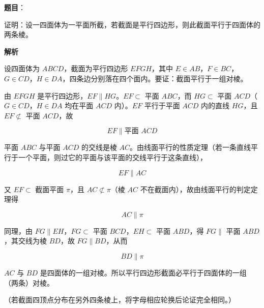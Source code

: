\begin{answer}

\textbf{题目}：

证明：设一四面体为一平面所截，若截面是平行四边形，则此截面平行于四面体的两条棱。

\textbf{解析}

设四面体为 $ABCD$，截面为平行四边形 $EFGH$，其中 $E\in AB$，$F\in BC$，$G\in CD$，$H\in DA$，四条边分别落在四个面内。要证：截面平行于一组对棱。

由 $EFGH$ 是平行四边形，$EF\parallel HG$。$EF\subset$ 平面 $ABC$，而 $HG\subset$ 平面 $ACD$（$G\in CD$，$H\in DA$ 均在平面 $ACD$ 内）。$EF$ 平行于平面 $ACD$ 内的直线 $HG$，且 $EF\not\subset$ 平面 $ACD$，故

\nopagebreak[4]
\[
EF\parallel \text{平面 } ACD
\]

平面 $ABC$ 与平面 $ACD$ 的交线是棱 $AC$。由线面平行的性质定理（若一条直线平行于一个平面，则过它的平面与该平面的交线平行于这条直线），

\nopagebreak[4]
\[
EF\parallel AC
\]

又 $EF\subset$ 截面平面 $\pi$，且 $AC\not\subset\pi$（棱 $AC$ 不在截面内），故由线面平行的判定定理得

\nopagebreak[4]
\[
AC\parallel\pi
\]

同理，由 $FG\parallel EH$，$FG\subset$ 平面 $BCD$，$EH\subset$ 平面 $ABD$，得 $FG\parallel$ 平面 $ABD$，其交线为棱 $BD$，故 $FG\parallel BD$，从而

\nopagebreak[4]
\[
BD\parallel\pi
\]

$AC$ 与 $BD$ 是四面体的一组对棱。所以平行四边形截面必平行于四面体的一组（两条）对棱。

（若截面四顶点分布在另外四条棱上，将字母相应轮换后论证完全相同。）


\end{answer}
